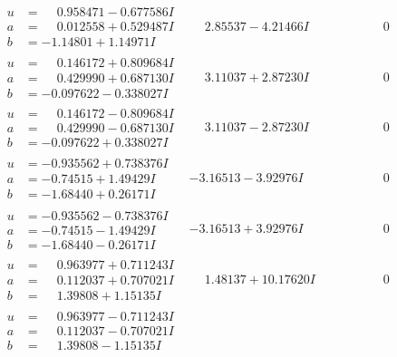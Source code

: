 \documentclass[1p]{elsarticle_modified}
\theoremstyle{definition}
\begin{document}
$$\begin{array}{c|c|c}
\begin{aligned}
u &= \phantom{-}0.958471 - 0.677586 I \\
a &= \phantom{-}0.012558 + 0.529487 I \\
b &= -1.14801 + 1.14971 I\end{aligned}
 & \phantom{-}2.85537 - 4.21466 I & \phantom{-0.000000 } 0 \\ \hline\begin{aligned}
u &= \phantom{-}0.146172 + 0.809684 I \\
a &= \phantom{-}0.429990 + 0.687130 I \\
b &= -0.097622 - 0.338027 I\end{aligned}
 & \phantom{-}3.11037 + 2.87230 I & \phantom{-0.000000 } 0 \\ \hline\begin{aligned}
u &= \phantom{-}0.146172 - 0.809684 I \\
a &= \phantom{-}0.429990 - 0.687130 I \\
b &= -0.097622 + 0.338027 I\end{aligned}
 & \phantom{-}3.11037 - 2.87230 I & \phantom{-0.000000 } 0 \\ \hline\begin{aligned}
u &= -0.935562 + 0.738376 I \\
a &= -0.74515 + 1.49429 I \\
b &= -1.68440 + 0.26171 I\end{aligned}
 & -3.16513 - 3.92976 I & \phantom{-0.000000 } 0 \\ \hline\begin{aligned}
u &= -0.935562 - 0.738376 I \\
a &= -0.74515 - 1.49429 I \\
b &= -1.68440 - 0.26171 I\end{aligned}
 & -3.16513 + 3.92976 I & \phantom{-0.000000 } 0 \\ \hline\begin{aligned}
u &= \phantom{-}0.963977 + 0.711243 I \\
a &= \phantom{-}0.112037 + 0.707021 I \\
b &= \phantom{-}1.39808 + 1.15135 I\end{aligned}
 & \phantom{-}1.48137 + 10.17620 I & \phantom{-0.000000 } 0 \\ \hline\begin{aligned}
u &= \phantom{-}0.963977 - 0.711243 I \\
a &= \phantom{-}0.112037 - 0.707021 I \\
b &= \phantom{-}1.39808 - 1.15135 I\end{aligned}

\end{array}$$
\end{document}
